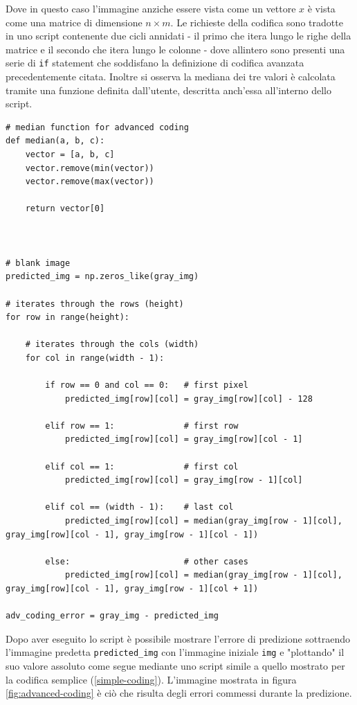 \noindent Dove in questo caso l'immagine anziche essere vista come un vettore $x$ è vista come una matrice di dimensione $n \times m$. Le richieste della codifica sono tradotte in uno script contenente due cicli annidati - il primo che itera lungo le righe della matrice e il secondo che itera lungo le colonne - dove allintero sono presenti una serie di \texttt{if} statement che soddisfano la definizione di codifica avanzata precedentemente citata. Inoltre si osserva la mediana dei tre valori è calcolata tramite una funzione definita dall'utente, descritta anch'essa all'interno dello script. 

\begin{lstlisting}
# median function for advanced coding
def median(a, b, c):
    vector = [a, b, c]
    vector.remove(min(vector))
    vector.remove(max(vector))
    
    return vector[0]



# blank image 
predicted_img = np.zeros_like(gray_img)

# iterates through the rows (height)
for row in range(height):

    # iterates through the cols (width)
    for col in range(width - 1):

        if row == 0 and col == 0:   # first pixel
            predicted_img[row][col] = gray_img[row][col] - 128
        
        elif row == 1:              # first row
            predicted_img[row][col] = gray_img[row][col - 1]
        
        elif col == 1:              # first col
            predicted_img[row][col] = gray_img[row - 1][col]
        
        elif col == (width - 1):    # last col
            predicted_img[row][col] = median(gray_img[row - 1][col], gray_img[row][col - 1], gray_img[row - 1][col - 1])

        else:                       # other cases
            predicted_img[row][col] = median(gray_img[row - 1][col], gray_img[row][col - 1], gray_img[row - 1][col + 1])

adv_coding_error = gray_img - predicted_img
\end{lstlisting}

\noindent Dopo aver eseguito lo script è possibile mostrare l'errore di predizione sottraendo l'immagine predetta \texttt{predicted\_img} con l'immagine iniziale \texttt{img} e "plottando" il suo valore assoluto come segue mediante uno script simile a quello mostrato per la codifica semplice (\ref{simple-coding}). L'immagine mostrata in figura \ref{fig:advanced-coding} è ciò che risulta degli errori commessi durante la predizione.

